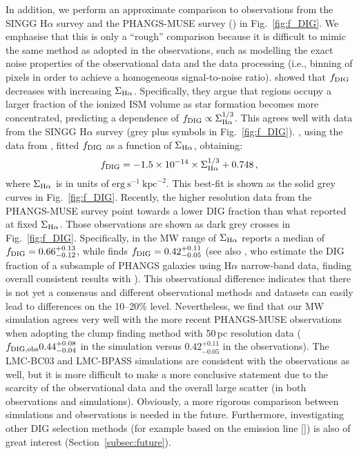 \documentclass[fleqn,usenatbib]{mnras}
\begin{document}
In addition, we perform an approximate comparison to observations from the SINGG H$\alpha$ survey \citep{oey07} and the PHANGS-MUSE survey (\citealt{emsellem21, belfiore22}) in Fig.~\ref{fig:f_DIG}. We emphasise that this is only a ``rough'' comparison because it is difficult to mimic the same method as adopted in the observations, such as modelling the exact noise properties of the observational data and the data processing (i.e., binning of pixels in order to achieve a homogeneous signal-to-noise ratio). \citet{oey07} showed that $f_{\rm DIG}$ decreases with increasing $\Sigma_{\rm H\alpha}$. Specifically, they argue that  regions occupy a larger fraction of the ionized ISM volume as star formation becomes more concentrated, predicting a dependence of $f_{\rm DIG} \propto \Sigma_{\rm H\alpha}^{1/3}$. This agrees well with data from the SINGG H$\alpha$ survey (grey plus symbols in Fig.~\ref{fig:f_DIG}). \citet{sanders17}, using the data from \citet{oey07}, fitted $f_{\rm DIG}$ as a function of $\Sigma_{\rm H\alpha}$, obtaining:
\begin{equation}
    f_{\rm DIG}=-1.5\times10^{-14}\times\Sigma_{\rm H\alpha}^{1/3} + 0.748 \, ,
\label{eq:fDIG}
\end{equation}
where $\Sigma_{\rm H\alpha}$ is in units of $\mathrm{erg}~\mathrm{s}^{-1}~\mathrm{kpc}^{-2}$. This best-fit is shown as the solid grey curves in Fig.~\ref{fig:f_DIG}. Recently, the higher resolution data from the PHANGS-MUSE survey \citep{belfiore22} point towards a lower DIG fraction than what \citet{oey07} reported at fixed $\Sigma_{\rm H\alpha}$. Those observations are shown as dark grey crosses in Fig.~\ref{fig:f_DIG}. Specifically, in the MW range of $\Sigma_{\rm H\alpha}$ \citet{oey07} reports a median of $f_{\rm DIG}=0.66_{-0.12}^{+0.13}$, while \citet{belfiore22} finds $f_{\rm DIG}=0.42_{-0.05}^{+0.11}$ (see also \citealt{chevance20}, who estimate the DIG fraction of a subsample of PHANGS galaxies using H$\alpha$ narrow-band data, finding overall consistent results with \citealt{belfiore22}). This observational difference indicates that there is not yet a consensus and different observational methods and datasets can easily lead to differences on the 10--20\% level. Nevertheless, we find that our MW simulation agrees very well with the more recent PHANGS-MUSE observations when adopting the clump finding method with 50\,pc resolution data ($f_{\rm DIG, obs}0.44_{-0.04}^{+0.08}$ in the simulation versus $0.42_{-0.05}^{+0.11}$ in the observations). The LMC-BC03 and LMC-BPASS simulations are consistent with the observations as well, but it is more difficult to make a more conclusive statement due to the scarcity of the observational data and the overall large scatter (in both observations and simulations). Obviously, a more rigorous comparison between simulations and observations is needed in the future. Furthermore, investigating other DIG selection methods (for example based on the emission line []) is also of great interest (Section~\ref{subsec:future}).
\end{document}
